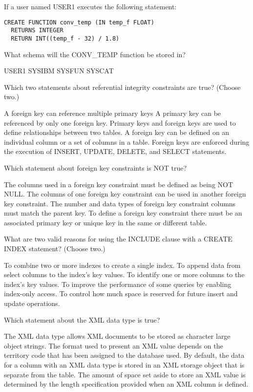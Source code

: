 \documentclass[11pt]{exam}
\begin{document}
\begin{questions}
\question[1]
If a user named USER1 executes the following statement:
\begin{verbatim}
CREATE FUNCTION conv_temp (IN temp_f FLOAT)
  RETURNS INTEGER
  RETURN INT((temp_f - 32) / 1.8)
\end{verbatim}
What schema will the CONV_TEMP function be stored in?
\begin{choices}
\choice USER1
\choice SYSIBM
\choice SYSFUN
\choice SYSCAT
\end{choices}

\question[1]
Which two statements about referential integrity constraints are true? (Choose two.)
\begin{choices}
\choice A foreign key can reference multiple primary keys
\choice A primary key can be referenced by only one foreign key.
\choice Primary keys and foreign keys are used to define relationships between two tables. 
\choice A foreign key can be defined on an individual column or a set of columns in a table.
\choice Foreign keys are enforced during the execution of INSERT, UPDATE, DELETE, and SELECT statements.
\end{choices}

\question[1]
Which statement about foreign key constraints is NOT true?
\begin{choices}
\choice The columns used in a foreign key constraint must be defined as being NOT NULL.
\choice The columns of one foreign key constraint can be used in another foreign key constraint.
\choice The number and data types of foreign key constraint columns must match the parent key.
\choice To define a foreign key constraint there must be an associated primary key or unique key in the same or different
table.
\end{choices}

\question[1]
What are two valid reasons for using the INCLUDE clause with a CREATE INDEX statement? (Choose two.)
\begin{choices}
\choice To combine two or more indexes to create a single index.
\choice To append data from select columns to the index's key values.
\choice To identify one or more columns to the index's key values.
\choice To improve the performance of some queries by enabling index-only access.
\choice To control how much space is reserved for future insert and update operations.
\end{choices}

\question[1]
Which statement about the XML data type is true?
\begin{choices}
\choice The XML data type allows XML documents to be stored as character large object strings.
\choice The format used to present an XML value depends on the territory code that has been assigned to the database used.
\choice By default, the data for a column with an XML data type is stored in an XML storage object that is separate from
the table.
\choice The amount of space set aside to store an XML value is determined by the length specification provided when an
XML column is defined.
\end{choices}


\end{questions}
\end{document}

